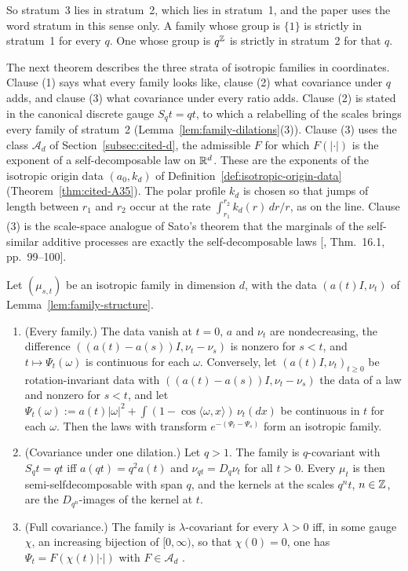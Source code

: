 So stratum~3 lies in stratum~2, which lies in stratum~1, and the paper uses the word stratum in
this sense only. A family whose group is $\{1\}$ is strictly in stratum~1 for every $q$. One whose
group is $q^{\mathbb{Z}}$ is strictly in stratum~2 for that $q$.

The next theorem describes the three strata of isotropic families in \Levy{} coordinates. Clause
(1) says what every family looks like, clause (2) what covariance under $q$ adds, and clause (3)
what covariance under every ratio adds. Clause (2) is stated in the canonical discrete gauge
$S_qt = qt$, to which a relabelling of the scales brings every family of stratum~2
(Lemma~\ref{lem:family-dilations}(3)). Clause (3) uses the class $\mathcal{A}_d$ of
Section~\ref{subsec:cited-d}, the admissible $F$ for which $F(|\cdot|)$ is the exponent of a
self-decomposable law on $\mathbb{R}^d$. These are the exponents of the isotropic origin data
$(a_0, k_d)$ of Definition~\ref{def:isotropic-origin-data} (Theorem~\ref{thm:cited-A35}). The
polar profile $k_d$ is chosen so that jumps of length between $r_1$ and $r_2$ occur at the rate
$\int_{r_1}^{r_2}k_d(r)\,dr/r$, as on the line. Clause (3) is the scale-space analogue of Sato's
theorem that the marginals of the self-similar additive processes are exactly the
self-decomposable laws [, Thm.~16.1, pp.~99--100].

\begin{theorem}
\label{thm:lattice-strata}

Let $(\mu_{s,t})$ be an isotropic family in dimension $d$, with the data $(a(t)I, \nu_t)$ of
Lemma~\ref{lem:family-structure}.
\begin{enumerate}
\item (Every family.) The data vanish at $t = 0$, $a$ and $\nu_t$ are nondecreasing, the difference
$((a(t) - a(s))I, \nu_t - \nu_s)$ is nonzero for $s < t$, and $t \mapsto \Psi_t(\omega)$ is
continuous for each $\omega$. Conversely, let $(a(t)I, \nu_t)_{t \ge 0}$ be rotation-invariant
\Levy{} data
with $((a(t) - a(s))I, \nu_t - \nu_s)$ the data of a law and nonzero
for $s < t$, and let $\Psi_t(\omega) := a(t)|\omega|^2 + \int(1 - \cos\langle\omega, x\rangle)\,\nu_t(dx)$
be continuous in $t$ for each $\omega$. Then the laws with transform $e^{-(\Psi_t - \Psi_s)}$ form an
isotropic family.
\item (Covariance under one dilation.) Let $q > 1$. The family is $q$-covariant with $S_qt = qt$ iff
$a(qt) = q^2a(t)$ and $\nu_{qt} = D_q\nu_t$ for all $t > 0$. Every $\mu_t$ is then
semi-selfdecomposable with span $q$, and the kernels at the scales $q^nt$, $n \in \mathbb{Z}$, are the
$D_{q^n}$-images of the kernel at $t$.
\item (Full covariance.) The family is $\lambda$-covariant for every $\lambda > 0$ iff, in some gauge
$\chi$, an increasing bijection of $[0,\infty)$, so that $\chi(0) = 0$, one has
$\Psi_t = F(\chi(t)|\cdot|)$ with $F \in \mathcal{A}_d$ .
\end{enumerate}
\end{theorem}

